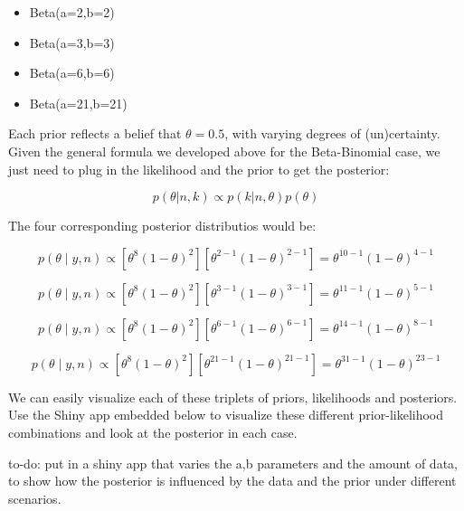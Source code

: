 \documentclass[12pt,]{krantz}
\providecommand{\tightlist}{%
  \setlength{\itemsep}{0pt}\setlength{\parskip}{0pt}}
\let\BeginKnitrBlock\begin \let\EndKnitrBlock\end
\begin{document}
\begin{itemize}
\tightlist
\item
  Beta(a=2,b=2)
\item
  Beta(a=3,b=3)
\item
  Beta(a=6,b=6)
\item
  Beta(a=21,b=21)
\end{itemize}

Each prior reflects a belief that \(\theta=0.5\), with varying degrees of (un)certainty. Given the general formula we developed above for the Beta-Binomial case, we just need to plug in the likelihood and the prior to get the posterior:

\begin{equation}
p(\theta | n,k) \propto p(k |n,\theta) p(\theta)
\end{equation}

The four corresponding posterior distributios would be:

\begin{equation}
p(\theta\mid y,n) \propto [\theta^{8} (1-\theta)^{2}] [\theta^{2-1}(1-\theta)^{2-1}] = \theta^{10-1} (1-\theta)^{4-1}
\end{equation}

\begin{equation}
p(\theta\mid y,n) \propto [\theta^{8} (1-\theta)^{2}] [\theta^{3-1}(1-\theta)^{3-1}] = \theta^{11-1} (1-\theta)^{5-1}
\end{equation}

\begin{equation}
p(\theta\mid y,n) \propto [\theta^{8} (1-\theta)^{2}] [\theta^{6-1}(1-\theta)^{6-1}] = \theta^{14-1} (1-\theta)^{8-1}
\end{equation}

\begin{equation}
p(\theta\mid y,n) \propto [\theta^{8} (1-\theta)^{2}] [\theta^{21-1}(1-\theta)^{21-1}] = \theta^{31-1} (1-\theta)^{23-1}
\end{equation}

We can easily visualize each of these triplets of priors, likelihoods and posteriors. Use the Shiny app embedded below to visualize these different prior-likelihood combinations and look at the posterior in each case.

\BeginKnitrBlock{rmdnote}
to-do: put in a shiny app that varies the a,b parameters and the amount of data, to show how the posterior is influenced by the data and the prior under different scenarios.
\EndKnitrBlock{rmdnote}
\end{document}
